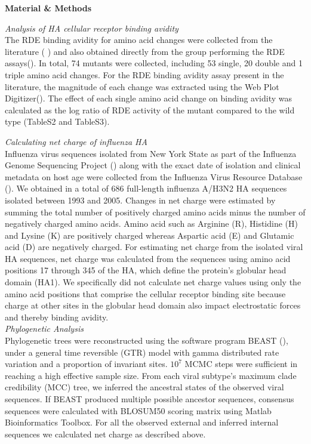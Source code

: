 \documentclass[12pt,a4paper]{article}
\begin{document}
{\bf Material \& Methods}

\textit{Analysis of HA cellular receptor binding avidity} \\
The RDE binding avidity for amino acid changes were collected from the literature (\cite{Hensley2009} \cite{Das2011} \cite{Myers2013} \cite{Li2013a}) and also obtained directly from the group performing the RDE assays(\cite{Hensley2009}). In total, 74 mutants were collected, including 53 single, 20 double and 1 triple amino acid changes. For the RDE binding avidity assay present in the literature, the magnitude of each change was extracted using the Web Plot Digitizer(\cite{Rohatgi2012}). The effect of each single amino acid change on binding avidity was calculated as the log ratio of RDE activity of the mutant compared to the wild type (TableS2 and TableS3).

\textit{Calculating net charge of influenza HA} \\
Influenza virus sequences isolated from New York State as part of the Influenza Genome Sequencing Project (\cite{Ghedin2005}) along with the exact date of isolation and clinical metadata on host age were collected from the Influenza Virus Resource Database (\cite{Bao2008}). We obtained in a total of 686 full-length influenza A/H3N2 HA sequences isolated between 1993 and 2005. Changes in net charge were estimated by summing the total number of positively charged amino acids minus the number of negatively charged amino acids. Amino acid such as Arginine (R), Histidine (H) and Lysine (K) are positively charged whereas Aspartic acid (E) and Glutamic acid (D) are negatively charged. For estimating net charge from the isolated viral HA sequences, net charge was calculated from the sequences using amino acid positions 17 through 345 of the HA, which define the protein’s globular head domain (HA1). We specifically did not calculate net charge values using only the amino acid positions that comprise the cellular receptor binding site because charge at other sites in the globular head domain also impact electrostatic forces and thereby binding avidity. \\
\textit{Phylogenetic Analysis} \\
Phylogenetic trees were reconstructed using the software program BEAST (\cite{Drummond2012}), under a general time reversible (GTR) model with gamma distributed rate variation and a proportion of invariant sites. $10^{7}$ MCMC steps were sufficient in reaching a high effective sample size. From each viral subtype’s maximum clade credibility (MCC) tree, we inferred the ancestral states of the observed viral sequences. If BEAST produced multiple possible ancestor sequences, consensus sequences were calculated with BLOSUM50 scoring matrix using Matlab Bioinformatics Toolbox. For all the observed external and inferred internal sequences we calculated net charge as described above.
\end{document}
